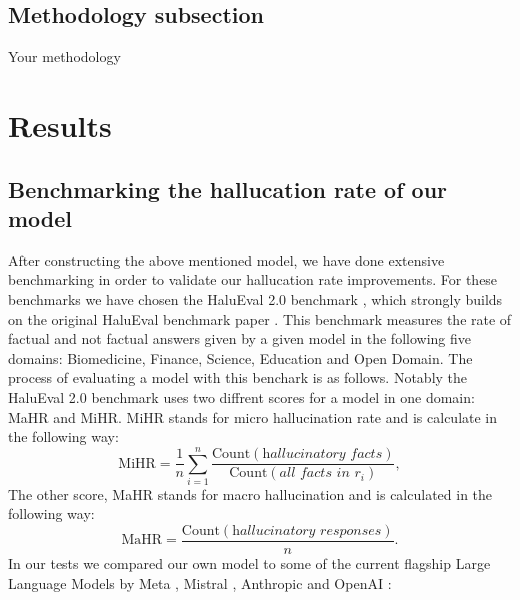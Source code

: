 \documentclass[10pt,leqno,twoside]{article}
\begin{document}
\subsection{Methodology subsection}
Your methodology

\section{Results}

\subsection{Benchmarking the hallucation rate of our model}


After constructing the above mentioned model, we have done extensive benchmarking in order to validate our hallucation rate improvements. For these benchmarks we have chosen the HaluEval 2.0 benchmark \cite{li2024dawn}, which strongly builds on the original HaluEval benchmark paper \cite{li2023halueval}. This benchmark measures the rate of factual and not factual answers given by a given model in the following five domains: Biomedicine, Finance, Science, Education and Open Domain.   The process of evaluating a model with this benchark is as follows. Notably the HaluEval 2.0 benchmark uses two diffrent scores for a model in one domain: MaHR and MiHR. MiHR stands for micro hallucination rate and is calculate in the following way: 
\[
\text{MiHR} = \frac{1}{n} \sum_{i=1}^{n} 
\frac{\text{Count}(\textit{hallucinatory facts})}
{\text{Count}(\textit{all facts in } r_i)},
\]
The other score, MaHR stands for macro hallucination and is calculated in the following way:
\[
\text{MaHR} = \frac{\text{Count}(\textit{hallucinatory responses})}{n}.
\]
 In our tests we compared our own model to some of the current flagship Large Language Models by Meta \cite{Llama}, Mistral \cite{Mistral}, Anthropic \cite{Anthropic} and OpenAI \cite{OpenAI}:
\end{document}
